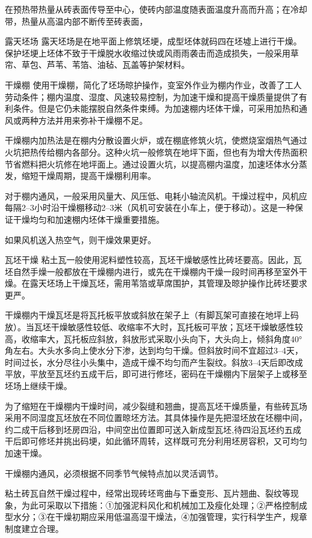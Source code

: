 \documentclass{ctexbook}
\begin{document}
在预热带热量从砖表面传导至中心，使砖内部温度随表面温度升高而升高；在冷却带，热量从高温内部不断传至砖表面，

露天坯场 露天坯场是在地平面上修筑坯埂，成型坯体就码四在坯墟上进行干燥。保护坯埂上坯体不致于干燥脱水收缩过快或风雨雨袭击而造成损失，一般采用草帘、草包、芦苇、苇箔、油毡、瓦盖等护架材料。

干燥棚 使用干燥棚，简化了坯场晾护操作，变室外作业为棚内作业，改善了工人劳动条件；棚内温度、湿度、风速较易控制，为加速干燥和提高干燥质量提供了有利条件。但是它仍未能摆脱自然条件束缚。为加速棚内坯体干燥，可采用加热和通风或两种方法并用来弥补干燥棚不足。

干燥棚内加热法是在棚内分散设置火炉，或在棚底修筑火坑，使燃烧室烟热气通过火坑把热传给棚内各部分。这种火坑一般修筑在地坪下面，但也有为增大传热面积节省燃料把火坑修在地坪面上。通过设置火坑，以提高棚内温度，加速坯体水分蒸发，缩短干燥周期，提高干燥棚利用率。

对于棚内通风，一般采用风量大、风压低、电耗小轴流风机。干燥过程中，风机应每隔2--3小时沿干燥棚移动2--3米（风机可安装在小车上，便于移动）。这是一种保证干燥均匀和加速棚内坯体干燥重要措施。

如果风机送入热空气，则干燥效果更好。

瓦坯干燥 粘土瓦一般使用泥料塑性较高，瓦坯干燥敏感性比砖坯要高。因此，瓦坯自然手燥一般都放在干燥棚内进行，或先在干燥棚内干燥一段时间再移至室外干燥。在露天坯场上干燥瓦坯，需用苇箔或草席围护，其管理及晾护操作比砖坯要求更严。

干燥棚内干燥瓦坯是将瓦托板平放或斜放在架子上（有脚瓦架可直接在地坪上码放）。当瓦坯干燥敏感性较低、收缩率不大时，瓦托板可平放；瓦坯干燥敏感性较高，收缩率大，瓦托板应斜放，斜放形式采取小头向下，大头向上，倾斜角度40°角左右。大头水多向上使水分下渗，达到均匀干燥。但斜放时间不宜超过3--4天，时间过长，水分尽往小头集中，造成干燥不均匀而产生裂纹。斜放3--4天后即改成平放，平放至瓦坯约五成干后，即可进行修坯，密码在干燥棚内下层架子上或移至坯场上继续干燥。

为了缩短在干燥棚内干燥时间，减少裂缝和翘曲，提高瓦坯干燥质量，有些砖瓦场采用不同湿度瓦坯放在不同位置晾坯方法。其具体操作是先把湿坯放在坯棚中间，约二成干后移到坯房四沿，中间空出位置即可送入新成型瓦坯,待四沿瓦坯约五成干后即可修坯并挑出码埂，如此循环周转，这样既可充分利用坯房容积，又可均匀加速干燥。

干燥棚内通风，必须根据不同季节气候特点加以灵活调节。

粘土砖瓦自然干燥过程中，经常出现砖坯弯曲与下垂变形、瓦片翘曲、裂纹等现象，为此可采取以下措施：①加强泥料风化和机械加工及瘦化处理；②严格控制成型水分；③在干燥初期应采用低温高湿干燥法，④加强管理，实行科学生产，规章制度建立合理。
\end{document}
